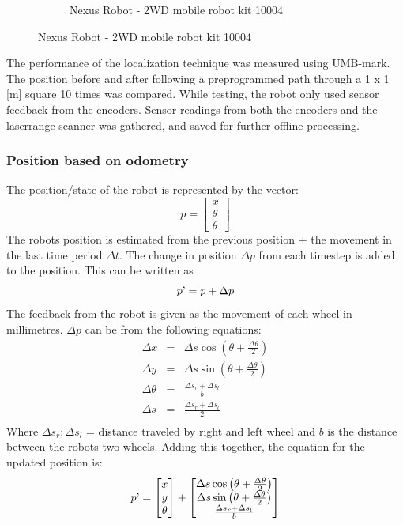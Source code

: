 \begin{figure}[ht]
\begin{subfigure}[t]{0.4\textwidth}
    \caption{Nexus Robot - 2WD mobile robot kit 10004}
    \label{laserrange}
  \end{subfigure}
\end{figure}


The performance of the localization technique was measured using UMB-mark. 
The position before and after following a preprogrammed path through a 1 x 1 [m] square 10 times was compared. 
While testing, the robot only used sensor feedback from the encoders. 
Sensor readings from both the encoders and the laserrange scanner was gathered, and saved for further offline processing. 

\subsubsection{Position based on odometry}
The position/state of the robot is represented by the vector: 
\begin{equation}
  p = 
  \begin{bmatrix}
    x \\
    y \\
    \theta 
  \end{bmatrix}
\end{equation}
The robots position is estimated from the previous position + the movement in the last time period $\Delta t$. The change in position $\Delta p$ from each timestep is added to the position. This can be written as 
\begin{equation}
  p\textrm' = p + \Delta p
\end{equation}
The feedback from the robot is given as the movement of each wheel in millimetres. $\Delta p$ can be from the following equations: 
\begin{eqnarray}
	\Delta x &=& \Delta s \cos \left(\theta + \frac{\Delta \theta}{2}\right) \\
	\Delta y &=& \Delta s \sin \left(\theta + \frac{\Delta \theta}{2}\right) \\
	\Delta \theta &=& \frac{\Delta s_r + \Delta s_l}{b} \\
	\Delta s &=& \frac{\Delta s_r + \Delta s_l}{2} \\
\end{eqnarray}
Where $\Delta s_r; \Delta s_l$ = distance traveled by right and left wheel and $b$ is the distance between the robots two wheels. Adding this together, the equation for the updated position is: 
\begin{equation}
  p\textrm' = 
  \begin{bmatrix}
    x \\
    y \\
    \theta 
  \end{bmatrix}
  +
  \begin{bmatrix}
    \Delta s \cos \left(\theta + \frac{\Delta \theta}{2}\right) \\
    \Delta s \sin \left(\theta + \frac{\Delta \theta}{2}\right) \\
    \frac{\Delta s_r + \Delta s_l}{b}
  \end{bmatrix}
\end{equation}



